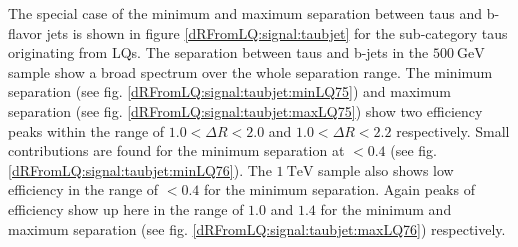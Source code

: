 %
The special case of the minimum and maximum separation between taus and b-flavor jets is shown in figure \ref{dRFromLQ:signal:taubjet} for the sub-category taus originating from LQs. The separation between taus and b-jets in the $\SI{500}{\giga\electronvolt}$ sample show a broad spectrum over the whole separation range. The minimum separation (see fig. \ref{dRFromLQ:signal:taubjet:minLQ75}) and maximum separation (see fig. \ref{dRFromLQ:signal:taubjet:maxLQ75}) show two efficiency peaks within the range of $1.0<\Delta R<2.0$ and $1.0<\Delta R<2.2$ respectively. Small contributions are found for the minimum separation at $<0.4$ (see fig. \ref{dRFromLQ:signal:taubjet:minLQ76}). The $\SI{1}{\tera\electronvolt}$ sample also shows low efficiency in the range of $<0.4$ for the minimum separation. Again peaks of efficiency show up here in the range of $1.0$ and $1.4$ for the minimum and maximum separation (see fig. \ref{dRFromLQ:signal:taubjet:maxLQ76}) respectively.
%
